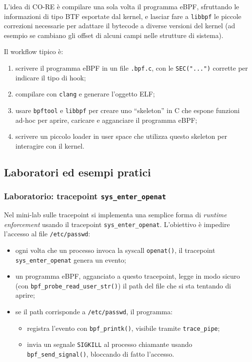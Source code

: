 L’idea di CO-RE è compilare una sola volta il programma eBPF, sfruttando le
informazioni di tipo BTF esportate dal kernel, e lasciar fare a \texttt{libbpf}
le piccole correzioni necessarie per adattare il bytecode a diverse versioni
del kernel (ad esempio se cambiano gli offset di alcuni campi nelle strutture
di sistema).

Il workflow tipico è:

\begin{enumerate}
  \item scrivere il programma eBPF in un file \texttt{.bpf.c}, con le
        \texttt{SEC("...")} corrette per indicare il tipo di hook;
  \item compilare con \texttt{clang} e generare l’oggetto ELF;
  \item usare \texttt{bpftool} e \texttt{libbpf} per creare uno ``skeleton''
        in C che espone funzioni ad-hoc per aprire, caricare e agganciare
        il programma eBPF;
  \item scrivere un piccolo loader in user space che utilizza questo skeleton
        per interagire con il kernel.
\end{enumerate}

\newpage


\subsection{Laboratori ed esempi pratici}

\subsubsection{Laboratorio: tracepoint \texttt{sys\_enter\_openat}}

Nel mini-lab sulle tracepoint si implementa una semplice forma di
\textit{runtime enforcement} usando il tracepoint
\texttt{sys\_enter\_openat}. L’obiettivo è impedire l’accesso al file
\texttt{/etc/passwd}:

\begin{itemize}
  \item ogni volta che un processo invoca la syscall \texttt{openat()}, il
        tracepoint \texttt{sys\_enter\_openat} genera un evento;
  \item un programma eBPF, agganciato a questo tracepoint, legge in modo sicuro\\
        (con \texttt{bpf\_probe\_read\_user\_str()}) il path del file
        che si sta tentando di aprire;
  \item se il path corrisponde a \texttt{/etc/passwd}, il programma:
        \begin{itemize}
          \item registra l’evento con \texttt{bpf\_printk()}, visibile tramite
                \texttt{trace\_pipe};
          \item invia un segnale \texttt{SIGKILL} al processo chiamante
                usando \texttt{bpf\_send\_signal()}, bloccando di fatto l’accesso.
        \end{itemize}
\end{itemize}

